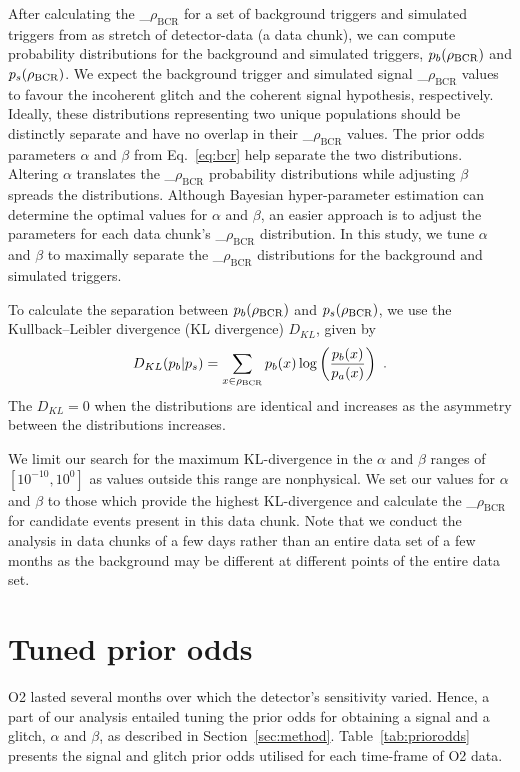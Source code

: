 \documentclass[%
 nofootinbib,
 amsmath,amssymb,
 aps,
 twocolumn
]{revtex4-2}
\newcommand{\mathcmd}[1]{{\sc \relax\ifmmode#1\else $#1$\fi}\xspace}
\newcommand{\bcr}{\mathcmd{\rho_\text{BCR}}}
\begin{document}
After calculating the \bcr for a set of background triggers and simulated triggers from as stretch of detector-data (a data chunk), we can compute probability distributions for the background and simulated triggers, $p_b(\bcr)$ and $p_s(\bcr)$. We expect the background trigger and simulated signal \bcr values to favour the incoherent glitch and the coherent signal hypothesis, respectively. Ideally, these distributions representing two unique populations should be distinctly separate and have no overlap in their \bcr values. The prior odds parameters $\alpha$ and $\beta$ from Eq.~\ref{eq:bcr} help separate the two distributions. Altering $\alpha$ translates the \bcr probability distributions while adjusting $\beta$ spreads the distributions. Although Bayesian hyper-parameter estimation can determine the optimal values for $\alpha$ and $\beta$, an easier approach is to adjust the parameters for each data chunk's \bcr distribution. In this study, we tune $\alpha$ and $\beta$ to maximally separate the \bcr distributions for the background and simulated triggers. 

To calculate the separation between $p_b(\bcr)$ and $p_s(\bcr)$, we use the Kullback--Leibler divergence (KL divergence) $D_{KL}$, given by
\begin{equation}
    D_{KL}(p_b | p_s) = \sum\limits_{x\in \bcr} p_b(x) \log \left( \frac{p_b(x)}{p_a(x)} \right)  \ .
\end{equation}
The $D_{KL}=0$ when the distributions are identical and increases as the asymmetry between the distributions increases. 

We limit our search for the maximum KL-divergence in the $\alpha$ and $\beta$ ranges of $[10^{-10}, 10^0]$ as values outside this range are nonphysical. We set our values for $\alpha$ and $\beta$ to those which provide the highest KL-divergence and calculate the \bcr for candidate events present in this data chunk. Note that we conduct the analysis in data chunks of a few days rather than an entire data set of a few months as the background may be different at different points of the entire data set.




\section{Tuned prior odds}\label{apdx:alphabeta}

O2 lasted several months over which the detector's sensitivity varied. Hence, a part of our analysis entailed tuning the prior odds for obtaining a signal and a glitch, $\alpha$ and $\beta$, as described in Section~\ref{sec:method}. Table~\ref{tab:priorodds} presents the signal and glitch prior odds utilised for each time-frame of O2 data. 

\end{document}
